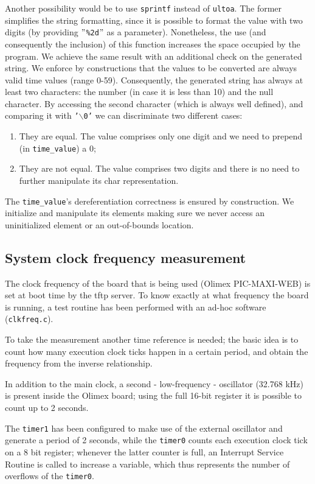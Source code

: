 Another possibility would be to use \texttt{sprintf} instead of \texttt{ultoa}. The former simplifies the string formatting, since it is possible to format the value with two digits (by providing \texttt{$"$\%2d$"$} as a parameter). Nonetheless, the use (and consequently the inclusion) of this function increases the space occupied by the program. We achieve the same result with an additional check on the generated string. We enforce by constructions that the values to be converted are always valid time values (range 0-59). Consequently, the generated string has always at least two characters: the number (in case it is less than 10) and the null character. By accessing the second character (which is always well defined), and comparing it with \texttt{'$\backslash$0'} we can discriminate two different cases:
\begin{enumerate}
	\item They are equal. The value comprises only one digit and we need to prepend (in \texttt{time\_value}) a $0$;
	\item They are not equal. The value comprises two digits and there is no need to further manipulate its char representation.
\end{enumerate}
The \texttt{time\_value}'s dereferentiation correctness is ensured by construction. We initialize and manipulate its elements making sure we never access an uninitialized element or an out-of-bounds location.

\subsection{System clock frequency measurement}
The clock frequency of the board that is being used (Olimex PIC-MAXI-WEB) is set at boot time by the tftp server. To know exactly at what frequency the board is running, a test routine has been performed with an ad-hoc software (\texttt{clkfreq.c}).

To take the measurement another time reference is needed; the basic idea is to count how many execution clock ticks happen in a certain period, and obtain the frequency from the inverse relationship.

In addition to the main clock, a second - low-frequency - oscillator (32.768 kHz) is present inside the Olimex board; using the full 16-bit register it is possible to count up to 2 seconds.

The \texttt{timer1} has been configured to make use of the external oscillator and generate a period of 2 seconds, while the \texttt{timer0} counts each execution clock tick on a 8 bit register; whenever the latter counter is full, an Interrupt Service Routine is called to increase a variable, which thus represents the number of overflows of the \texttt{timer0}.\\

